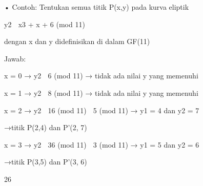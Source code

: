 \documentclass{article}
\begin{document}

• Contoh: Tentukan semua titik P(x,y) pada kurva eliptik 


y2  x3 + x + 6  (mod 11)  

    dengan x dan y didefinisikan di dalam GF(11)

 Jawab:

 x = 0 → y2  6  (mod 11) → tidak ada nilai y yang memenuhi

 x = 1 → y2   8  (mod 11) → tidak ada nilai y yang memenuhi

 x = 2 → y2  16  (mod 11)  5 (mod 11) → y1 = 4 dan y2 = 7






         →titik P(2,4)  dan P’(2, 7)

 x = 3 → y2  36  (mod 11)  3  (mod 11) → y1 = 5 dan y2 = 6






         →titik P(3,5)  dan P’(3, 6)

26
\end{document}
